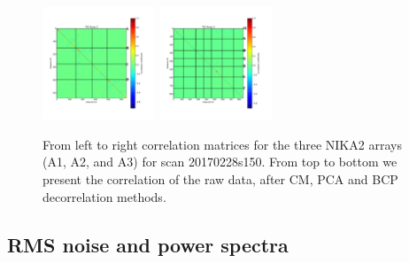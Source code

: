 \begin{figure}[ht]
\begin{center}
\includegraphics[width=0.3\textwidth]{Figures/NoiseTests/corrmat_TOI_BCP_array_2_20170228s151.pdf}
\includegraphics[width=0.3\textwidth]{Figures/NoiseTests/corrmat_TOI_BCP_array_3_20170228s151.pdf}
\end{center}
\caption[KID-to-KID correlation matrices]{From left to right correlation matrices for the three NIKA2 arrays (A1, A2, and A3) for scan 20170228s150. From top to bottom we present the correlation of the raw data, after CM, PCA and BCP decorrelation methods. \label{corrmatrix}}
\end{figure}



\subsection{RMS noise and power spectra}

